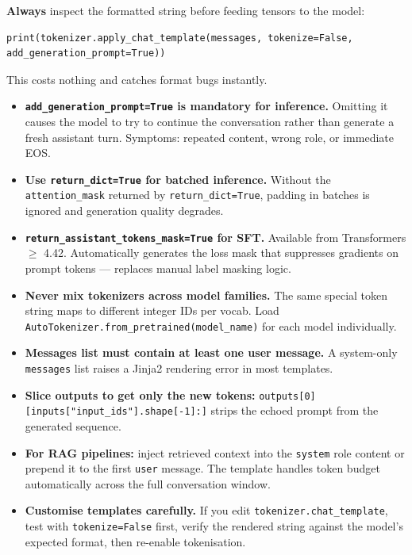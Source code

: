 \documentclass[11pt,a4paper]{article}
\begin{document}
\begin{tcolorbox}[notebox={Debug-First Workflow}]
\textbf{Always} inspect the formatted string before feeding tensors to the model:
\begin{lstlisting}[style=pycode, numbers=none]
print(tokenizer.apply_chat_template(messages, tokenize=False, add_generation_prompt=True))
\end{lstlisting}
This costs nothing and catches format bugs instantly.
\end{tcolorbox}

\begin{itemize}[noitemsep, topsep=4pt, leftmargin=1.2em]

  \item \textbf{\texttt{add\_generation\_prompt=True} is mandatory for inference.}
    Omitting it causes the model to try to continue the conversation rather than generate a fresh assistant turn. Symptoms: repeated content, wrong role, or immediate EOS.

  \item \textbf{Use \texttt{return\_dict=True} for batched inference.}
    Without the \texttt{attention\_mask} returned by \texttt{return\_dict=True}, padding in batches is ignored and generation quality degrades.

  \item \textbf{\texttt{return\_assistant\_tokens\_mask=True} for SFT.}
    Available from Transformers $\ge$ 4.42. Automatically generates the loss mask that suppresses gradients on prompt tokens --- replaces manual label masking logic.

  \item \textbf{Never mix tokenizers across model families.}
    The same special token string maps to different integer IDs per vocab. Load \texttt{AutoTokenizer.from\_pretrained(model\_name)} for each model individually.

  \item \textbf{Messages list must contain at least one user message.}
    A system-only \texttt{messages} list raises a Jinja2 rendering error in most templates.

  \item \textbf{Slice outputs to get only the new tokens:}
    \texttt{outputs[0][inputs["input\_ids"].shape[-1]:]} strips the echoed prompt from the generated sequence.

  \item \textbf{For RAG pipelines:} inject retrieved context into the \texttt{system} role content or prepend it to the first \texttt{user} message. The template handles token budget automatically across the full conversation window.

  \item \textbf{Customise templates carefully.}
    If you edit \texttt{tokenizer.chat\_template}, test with \texttt{tokenize=False} first, verify the rendered string against the model's expected format, then re-enable tokenisation.

\end{itemize}
\end{document}
